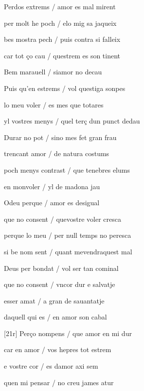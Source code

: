\documentclass[12pt]{article}
\begin{document}
\begin{estrofa}

 Perdos extrems / amor es mal mirent

 per molt he poch / elo mig sa jaqueix

 bes mostra pech / puis contra si falleix

 car tot \c{c}o cau / questrem es son tinent

 Bem marauell / siamor no decau

 Puis qu'en estrems / vol questiga sonpes

 lo meu voler / es mes que totares

 yl vostres menys / quel ter\c{c} dun punct dedau

\end{estrofa}



\begin{estrofa}

 Durar no pot / sino mes fet gran frau

 trencant amor / de natura costums

 poch menys contrast / que tenebres elums

 en monvoler / yl de madona jau

 Odeu perque / amor es desigual

 que no consent / quevostre voler cresca

 perque lo meu / per null temps no peresca

 si be nom sent / quant mevendraquest mal

\end{estrofa}



\begin{estrofa}

 Deus per bondat / vol ser tan cominal

 que no consent / vncor dur e salvatje

 esser amat / a gran de sauantatje

 daquell qui es / en amor son cabal

 [21r] Per\c{c}o nompens / que amor en mi dur

 car en amor / vos hepres tot estrem

 e vostre cor / es damor axi sem

 quen mi pensar / no creu james atur

\end{estrofa}
\end{document}
